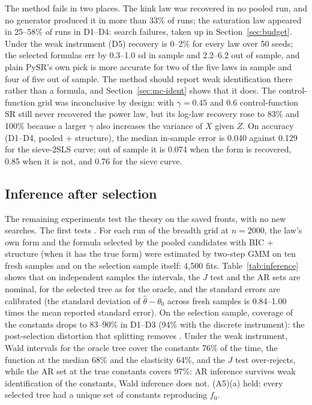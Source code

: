 The method fails in two places. The kink law was recovered in no pooled run, and no generator produced it in more than 33\% of runs; the saturation law appeared in 25--58\% of runs in D1--D4: search failures, taken up in Section~\ref{sec:budget}. Under the weak instrument (D5) recovery is 0--2\% for every law over 50 seeds; the selected formulas err by 0.3--1.0 sd in sample and 2.2--6.2 out of sample, and plain PySR's own pick is more accurate for two of the five laws in sample and four of five out of sample. The method should report weak identification there rather than a formula, and Section~\ref{sec:mc-ident} shows that it does. The control-function grid was inconclusive by design: with $\gamma = 0.45$ and $0.6$ control-function SR still never recovered the power law, but its log-law recovery rose to 83\% and 100\% because a larger $\gamma$ also increases the variance of $X$ given $Z$. On accuracy (D1--D4, pooled + structure), the median in-sample error is 0.040 against 0.129 for the sieve-2SLS curve; out of sample it is 0.074 when the form is recovered, 0.85 when it is not, and 0.76 for the sieve curve.

\subsection{Inference after selection}
\label{sec:mc-theory}

The remaining experiments test the theory on the saved fronts, with no new searches. The first tests . For each run of the breadth grid at $n = 2000$, the law's own form and the formula selected by the pooled candidates with BIC + structure (when it has the true form) were estimated by two-step GMM on ten fresh samples and on the selection sample itself: 4{,}500 fits. Table~\ref{tab:inference} shows that on independent samples the intervals, the $J$ test and the AR sets are nominal, for the selected tree as for the oracle, and the standard errors are calibrated (the standard deviation of $\hat\theta - \theta_0$ across fresh samples is 0.84--1.00 times the mean reported standard error). On the selection sample, coverage of the constants drops to 83--90\% in D1--D3 (94\% with the discrete instrument): the post-selection distortion that splitting removes \citep{leebpotscher2005}. Under the weak instrument, Wald intervals for the oracle tree cover the constants 76\% of the time, the function at the median 68\% and the elasticity 64\%, and the $J$ test over-rejects, while the AR set at the true constants covers 97\%: AR inference survives weak identification of the constants, Wald inference does not. (A5)(a) held: every selected tree had a unique set of constants reproducing $f_0$.

